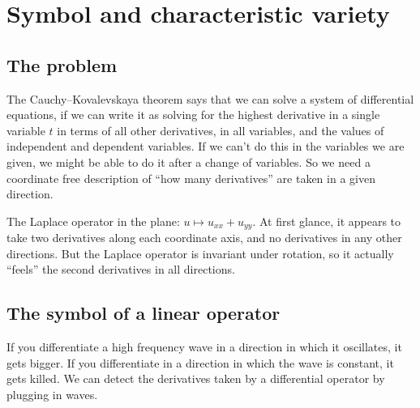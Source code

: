 \chapter{Symbol and characteristic variety}\label{chapter:characteristics}%
\section{The problem}
The Cauchy--Kovalevskaya theorem says that we can solve a system of differential equations, if we can write it as solving for the highest derivative in a single variable \(t\) in terms of all other derivatives, in all variables, and the values of independent and dependent variables.
If we can't do this in the variables we are given, we might be able to do it after a change of variables. 
So we need a coordinate free description of ``how many derivatives'' are taken in a given direction.
\begin{example}The Laplace operator in the plane: \(u \mapsto u_{xx}+u_{yy}\).
At first glance, it appears to take two derivatives along each coordinate axis, and no derivatives in any other directions.
But the Laplace operator is invariant under rotation, so it actually ``feels'' the second derivatives in all directions.
\end{example}

\section{The symbol of a linear operator}
If you differentiate a high frequency wave in a direction in which it oscillates, it gets bigger.
If you differentiate in a direction in which the wave is constant, it gets killed.
We can detect the derivatives taken by a differential operator by plugging in waves.

